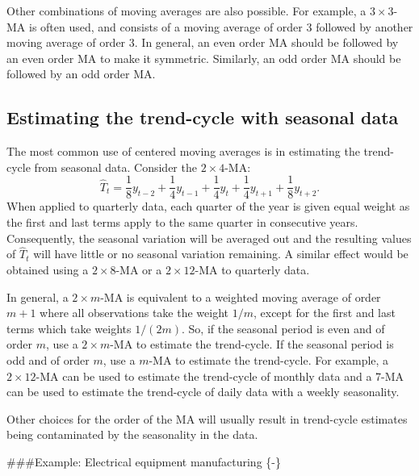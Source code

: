 \documentclass[]{book}
\begin{document}
Other combinations of moving averages are also possible. For example, a \(3\times3\)-MA is often used, and consists of a moving average of order 3 followed by another moving average of order 3. In general, an even order MA should be followed by an even order MA to make it symmetric. Similarly, an odd order MA should be followed by an odd order MA.

\hypertarget{estimating-the-trend-cycle-with-seasonal-data}{%
\subsection*{Estimating the trend-cycle with seasonal data}\label{estimating-the-trend-cycle-with-seasonal-data}}

The most common use of centered moving averages is in estimating the trend-cycle from seasonal data. Consider the \(2\times4\)-MA:
\[
  \hat{T}_{t} = \frac{1}{8}y_{t-2} + \frac14y_{t-1} +
    \frac14y_{t} + \frac14y_{t+1} + \frac18y_{t+2}.
\]
When applied to quarterly data, each quarter of the year is given equal weight as the first and last terms apply to the same quarter in consecutive years. Consequently, the seasonal variation will be averaged out and the resulting values of \(\hat{T}_t\) will have little or no seasonal variation remaining. A similar effect would be obtained using a \(2\times 8\)-MA or a \(2\times 12\)-MA to quarterly data.

In general, a \(2\times m\)-MA is equivalent to a weighted moving average of order \(m+1\) where all observations take the weight \(1/m\), except for the first and last terms which take weights \(1/(2m)\). So, if the seasonal period is even and of order \(m\), use a \(2\times m\)-MA to estimate the trend-cycle. If the seasonal period is odd and of order \(m\), use a \(m\)-MA to estimate the trend-cycle. For example, a \(2\times 12\)-MA can be used to estimate the trend-cycle of monthly data and a 7-MA can be used to estimate the trend-cycle of daily data with a weekly seasonality.

Other choices for the order of the MA will usually result in trend-cycle estimates being contaminated by the seasonality in the data.

\#\#\#Example: Electrical equipment manufacturing \{-\}
\end{document}
